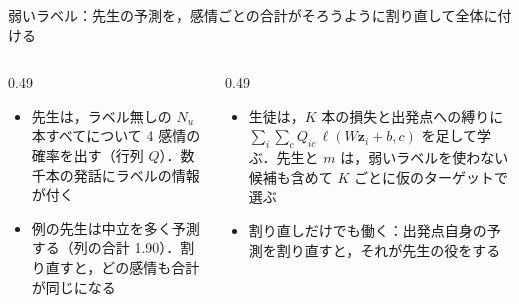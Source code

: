 \begin{frame}{弱いラベル：先生の予測を，感情ごとの合計がそろうように割り直して全体に付ける}
\begin{columns}[T,onlytextwidth]
\begin{column}{0.49\textwidth}
\begin{itemize}
        \item 先生は，ラベル無しの $N_u$ 本すべてについて 4 感情の確率を出す（行列 $Q$）．数千本の発話にラベルの情報が付く
        \item 例の先生は中立を多く予測する（列の合計 1.90）．割り直すと，どの感情も合計が同じになる
      \end{itemize}
    \end{column}
    \begin{column}{0.49\textwidth}
      \begin{itemize}\scriptsize\setlength{\itemsep}{3pt}
        \item 生徒は，$K$ 本の損失と出発点への縛りに $\sum_i \sum_c Q_{ic}\,\ell(W\mathbf{z}_i + b, c)$ を足して学ぶ．先生と $m$ は，弱いラベルを使わない候補も含めて $K$ ごとに仮のターゲットで選ぶ
        \item 割り直しだけでも働く：出発点自身の予測を割り直すと，それが先生の役をする
      \end{itemize}
    \end{column}
  \end{columns}
\end{frame}

